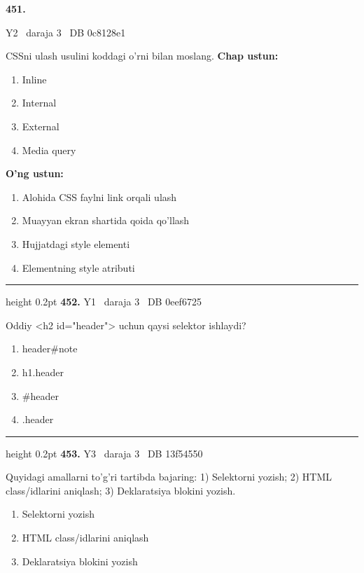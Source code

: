 \documentclass[10pt,a4paper,oneside]{article}
\begin{document}
\hypertarget{q451}{\textbf{\color{ink}451.}}  {\color{muted}\scriptsize Y2 \textbullet\ daraja 3 \textbullet\ DB 0c8128e1}
\par
CSSni ulash usulini koddagi o'rni bilan moslang.
\textbf{\footnotesize Chap ustun:}
\begin{enumerate}[label=\arabic*),leftmargin=9mm]
\item Inline
\item Internal
\item External
\item Media query
\end{enumerate}
\textbf{\footnotesize O'ng ustun:}
\begin{enumerate}[label=\Alph*),leftmargin=9mm]
\item Alohida CSS faylni link orqali ulash
\item Muayyan ekran shartida qoida qo'llash
\item Hujjatdagi style elementi
\item Elementning style atributi
\end{enumerate}
\vspace{2mm}\hrule height 0.2pt \vspace{4mm}
\hypertarget{q452}{\textbf{\color{ink}452.}}  {\color{muted}\scriptsize Y1 \textbullet\ daraja 3 \textbullet\ DB 0eef6725}
\par
Oddiy \textless{}h2 id="header"\textgreater{} uchun qaysi selektor ishlaydi?
\begin{enumerate}[label=\Alph*),leftmargin=9mm]
\item header\#note
\item h1.header
\item \#header
\item .header
\end{enumerate}
\vspace{2mm}\hrule height 0.2pt \vspace{4mm}
\hypertarget{q453}{\textbf{\color{ink}453.}}  {\color{muted}\scriptsize Y3 \textbullet\ daraja 3 \textbullet\ DB 13f54550}
\par
Quyidagi amallarni to'g'ri tartibda bajaring: 1) Selektorni yozish; 2) HTML class/idlarini aniqlash; 3) Deklaratsiya blokini yozish.
\begin{enumerate}[label=\Alph*),leftmargin=9mm]
\item Selektorni yozish
\item HTML class/idlarini aniqlash
\item Deklaratsiya blokini yozish
\end{enumerate}
\end{document}
